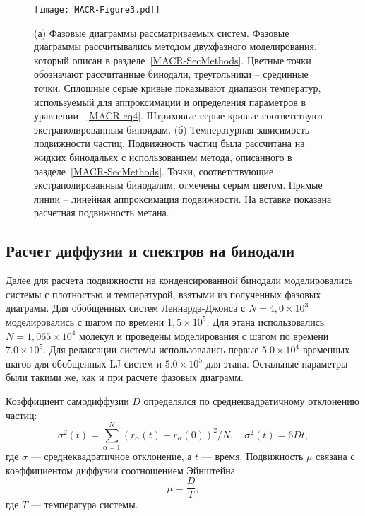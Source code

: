 \begin{figure}[!t]
\centering
    \texttt{[image: MACR-Figure3.pdf]}
    \caption{(а) Фазовые диаграммы рассматриваемых систем. 
    Фазовые диаграммы рассчитывались методом двухфазного моделирования, который описан в разделе~\ref{MACR-SecMethods}.
    Цветные точки обозначают рассчитанные бинодали, треугольники -- срединные точки.
    Сплошные серые кривые показывают диапазон температур, используемый для аппроксимации и определения параметров в уравнении ~\eqref{MACR-eq4}.
    Штриховые серые кривые соответствуют экстраполированным биноидам.
    (б) Температурная зависимость подвижности частиц.
    Подвижность частиц была рассчитана на жидких бинодальях с использованием метода, описанного в разделе~\ref{MACR-SecMethods}.
    Точки, соответствующие экстраполированным бинодалим, отмечены серым цветом. 
    Прямые линии -- линейная аппроксимация подвижности.
    На вставке показана расчетная подвижность метана.}
\label{MACR-Figure3}
\end{figure}

\subsection{Расчет диффузии и спектров на бинодали}

Далее для расчета подвижности на конденсированной бинодали моделировались системы с плотностью и температурой, взятыми из полученных фазовых диаграмм.
Для обобщенных систем Леннарда-Джонса с $N = 4,0 \times 10 ^ 3$ моделировались с шагом по времени $1,5 \times 10 ^ 5$.
Для этана использовались $N = 1,065 \times 10 ^ 4 $ молекул и проведены моделирования с шагом по времени $7.0 \times 10^5 $.
Для релаксации системы использовались первые $ 5.0 \times 10 ^ 4 $ временных шагов для обобщенных LJ-систем и $ 5.0 \times 10 ^ 5 $ для этана.
Остальные параметры были такими же, как и при расчете фазовых диаграмм.

Коэффициент самодиффузии $D$ определялся по среднеквадратичному отклонению частиц:
\begin{equation}
    \sigma^2(t) = \sum\limits_{\alpha = 1}^{N} (r_{\alpha}(t) - r_{\alpha}(0))^2 / N, \quad \sigma^2(t) = 6Dt,
    \label{MACR-eq5}
\end{equation}
где $\sigma$ — среднеквадратичное отклонение, а $t$ — время.
Подвижность $\mu$ связана с коэффициентом диффузии соотношением Эйнштейна
\begin{equation}
    \mu = \frac{D}{T},
    \label{MACR-eq6}
\end{equation}
где $T$ — температура системы.

